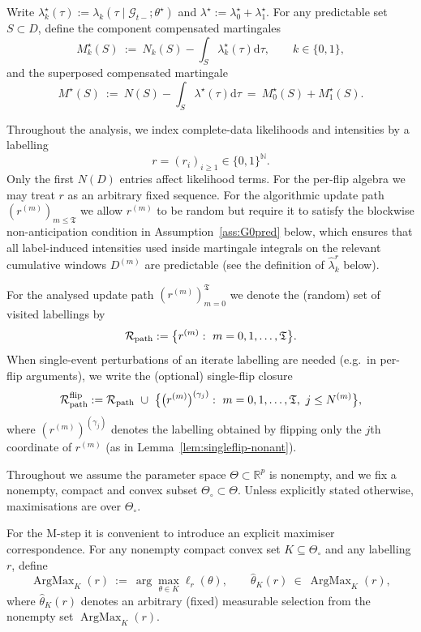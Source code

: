 \documentclass{statsoc}
\newcommand{\dd}{\mathrm{d}}
\newcommand{\bbR}{\mathbb{R}}
\newcommand{\1}{\mathbbm{1}}
\newcommand{\bbN}{\mathbb{N}}
\newcommand{\Tmax}{\mathfrak{T}}
\begin{document}
Write $\lambda_k^\star(\tau):=\lambda_k(\tau\mid \mathcal G_{t-};\theta^\star)$ and $\lambda^\star:=\lambda_0^\star+\lambda_1^\star$. For any predictable set $S\subset D$, define the component compensated martingales
\[
M_k^\star(S)\ :=\ N_k(S) - \int_S \lambda_k^\star(\tau) \dd\tau,\qquad k\in\{0,1\},
\]
and the superposed compensated martingale
\[
M^\star(S)\ :=\ N(S) - \int_S \lambda^\star(\tau) \dd\tau\ =\ M_0^\star(S)+M_1^\star(S).
\]

Throughout the analysis, we index complete-data likelihoods and intensities by a labelling
\[
r=(r_i)_{i\ge 1}\in\{0,1\}^{\bbN}.
\]
Only the first $N(D)$ entries affect likelihood terms. For the per-flip algebra we may treat $r$ as an arbitrary fixed sequence. For the algorithmic update path $(r^{(m)})_{m\le\Tmax}$ we allow $r^{(m)}$ to be random but require it to satisfy the blockwise non-anticipation condition in Assumption~\ref{ass:G0pred} below, which ensures that all label-induced intensities used inside martingale integrals on the relevant cumulative windows $D^{(m)}$ are predictable (see the definition of $\widehat\lambda_k^r$ below).

For the analysed update path $(r^{(m)})_{m=0}^{\Tmax}$ we denote the (random) set of visited labellings by
\[
\mathcal R_{\rm path}
:=\big\{r^{(m)}:\ m=0,1,\dots,\Tmax\big\}.
\]
When single-event perturbations of an iterate labelling are needed (e.g.\ in per-flip arguments),
we write the (optional) single-flip closure
\[
\mathcal R_{\rm path}^{\rm flip}
:=\mathcal R_{\rm path}\ \cup\
\big\{\big(r^{(m)}\big)^{(\gamma_j)}:\ m=0,1,\dots,\Tmax,\ j\le N^{(m)}\big\},
\]
where $(r^{(m)})^{(\gamma_j)}$ denotes the labelling obtained by flipping only the $j$th coordinate of $r^{(m)}$
(as in Lemma~\ref{lem:singleflip-nonant}).



Throughout we assume the parameter space $\Theta\subset\bbR^p$ is nonempty, and we fix a nonempty, compact and convex subset $\Theta_\circ\subset\Theta$. Unless explicitly stated otherwise, maximisations are over $\Theta_\circ$.

For the M-step it is convenient to introduce an explicit maximiser correspondence.
For any nonempty compact convex set $K\subseteq\Theta_\circ$ and any labelling $r$, define
\[
\operatorname{ArgMax}_K(r)\ :=\ \arg\max_{\theta\in K}\ell_r(\theta),
\qquad
\hat\theta_K(r)\ \in\ \operatorname{ArgMax}_K(r),
\]
where $\hat\theta_K(r)$ denotes an arbitrary (fixed) measurable selection from the nonempty set
$\operatorname{ArgMax}_K(r)$.
\end{document}

